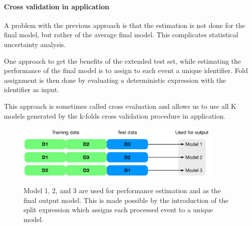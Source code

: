 \paragraph{Cross validation in application}
A problem with the previous approach is that the estimation is not done for the final model, but rather of the average final model. This complicates statistical uncertainty analysis.

One approach to get the benefits of the extended test set, while estimating the performance of the final model is to assign to each event a unique identifier. Fold assignment is then done by evaluating a deterministic expression with the identifier as input.

This approach is sometimes called cross evaluation and allows us to use all K models generated by the k-folds cross validation procedure in application. 




\begin{figure}
\begin{center}
   \includegraphics[width=0.9\textwidth]{plots/cv/cv-workflows-ce}
   \label{fig:workflow1}
   \caption{Model 1, 2, and 3 are used for performance estimation and as the final output model. This is made possible by the introduction of the split expression which assigns each processed event to a unique model.}
\end{center}
\end{figure}











